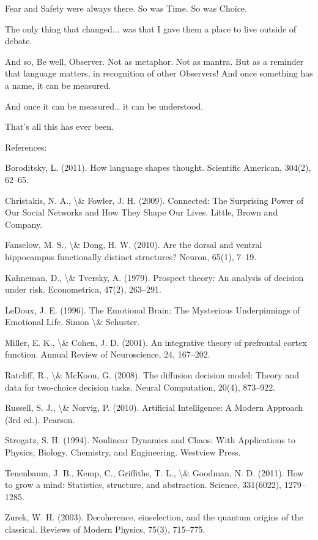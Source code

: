 \documentclass[12pt]{article}
\begin{document}
Fear and Safety were always there.
So was Time. So was Choice.

The only thing that changed... was that I gave them a place to live outside of debate.

And so, Be well, Observer.
Not as metaphor. Not as mantra.
But as a reminder that language matters, in recognition of other Observers!
And once something has a name,
it can be measured.

And once it can be measured…
it can be understood.

That’s all this has ever been. 

References:

Boroditsky, L. (2011). How language shapes thought. Scientific American, 304(2), 62–65.

Christakis, N. A., \textbackslash{}& Fowler, J. H. (2009). Connected: The Surprising Power of Our Social Networks and How They Shape Our Lives. Little, Brown and Company.

Fanselow, M. S., \textbackslash{}& Dong, H. W. (2010). Are the dorsal and ventral hippocampus functionally distinct structures? Neuron, 65(1), 7–19.

Kahneman, D., \textbackslash{}& Tversky, A. (1979). Prospect theory: An analysis of decision under risk. Econometrica, 47(2), 263–291.

LeDoux, J. E. (1996). The Emotional Brain: The Mysterious Underpinnings of Emotional Life. Simon \textbackslash{}& Schuster.

Miller, E. K., \textbackslash{}& Cohen, J. D. (2001). An integrative theory of prefrontal cortex function. Annual Review of Neuroscience, 24, 167–202.

Ratcliff, R., \textbackslash{}& McKoon, G. (2008). The diffusion decision model: Theory and data for two-choice decision tasks. Neural Computation, 20(4), 873–922.

Russell, S. J., \textbackslash{}& Norvig, P. (2010). Artificial Intelligence: A Modern Approach (3rd ed.). Pearson.

Strogatz, S. H. (1994). Nonlinear Dynamics and Chaos: With Applications to Physics, Biology, Chemistry, and Engineering. Westview Press.

Tenenbaum, J. B., Kemp, C., Griffiths, T. L., \textbackslash{}& Goodman, N. D. (2011). How to grow a mind: Statistics, structure, and abstraction. Science, 331(6022), 1279–1285.

Zurek, W. H. (2003). Decoherence, einselection, and the quantum origins of the classical. Reviews of Modern Physics, 75(3), 715–775.
\end{document}
